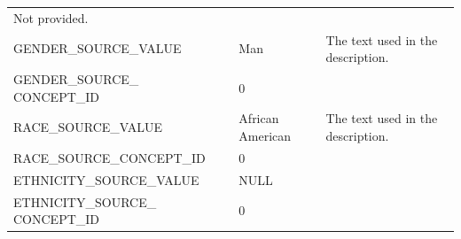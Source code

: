 \documentclass[11pt]{book}
\theoremstyle{definition}
\theoremstyle{definition}
\theoremstyle{definition}
\theoremstyle{remark}
\begin{document}
\begin{longtable}[]{@{}lll@{}}
\begin{minipage}[t]{0.49\columnwidth}
Not provided.\strut
\end{minipage}\tabularnewline
\begin{minipage}[t]{0.28\columnwidth}\raggedright
GENDER\_SOURCE\_VALUE\strut
\end{minipage} & \begin{minipage}[t]{0.15\columnwidth}\raggedright
Man\strut
\end{minipage} & \begin{minipage}[t]{0.49\columnwidth}\raggedright
The text used in the description.\strut
\end{minipage}\tabularnewline
\begin{minipage}[t]{0.28\columnwidth}\raggedright
GENDER\_SOURCE\_ CONCEPT\_ID\strut
\end{minipage} & \begin{minipage}[t]{0.15\columnwidth}\raggedright
0\strut
\end{minipage} & \begin{minipage}[t]{0.49\columnwidth}\raggedright
\strut
\end{minipage}\tabularnewline
\begin{minipage}[t]{0.28\columnwidth}\raggedright
RACE\_SOURCE\_VALUE\strut
\end{minipage} & \begin{minipage}[t]{0.15\columnwidth}\raggedright
African American\strut
\end{minipage} & \begin{minipage}[t]{0.49\columnwidth}\raggedright
The text used in the description.\strut
\end{minipage}\tabularnewline
\begin{minipage}[t]{0.28\columnwidth}\raggedright
RACE\_SOURCE\_CONCEPT\_ID\strut
\end{minipage} & \begin{minipage}[t]{0.15\columnwidth}\raggedright
0\strut
\end{minipage} & \begin{minipage}[t]{0.49\columnwidth}\raggedright
\strut
\end{minipage}\tabularnewline
\begin{minipage}[t]{0.28\columnwidth}\raggedright
ETHNICITY\_SOURCE\_VALUE\strut
\end{minipage} & \begin{minipage}[t]{0.15\columnwidth}\raggedright
NULL\strut
\end{minipage} & \begin{minipage}[t]{0.49\columnwidth}\raggedright
\strut
\end{minipage}\tabularnewline
\begin{minipage}[t]{0.28\columnwidth}\raggedright
ETHNICITY\_SOURCE\_ CONCEPT\_ID\strut
\end{minipage} & \begin{minipage}[t]{0.15\columnwidth}\raggedright
0\strut
\end{minipage} & \begin{minipage}[t]{0.49\columnwidth}\raggedright
\strut
\end{minipage}\tabularnewline
\bottomrule
\end{longtable}
\end{document}
